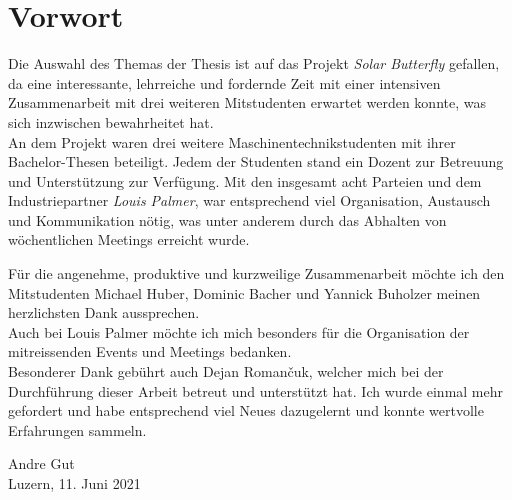 \section*{Vorwort}
Die Auswahl des Themas der Thesis ist auf das Projekt \emph{Solar Butterfly} gefallen, da eine interessante, lehrreiche und fordernde Zeit mit einer intensiven Zusammenarbeit mit drei weiteren Mitstudenten erwartet werden konnte, was sich inzwischen bewahrheitet hat.\\
An dem Projekt waren drei weitere Maschinentechnikstudenten mit ihrer Bachelor-Thesen beteiligt. Jedem der Studenten stand ein Dozent zur Betreuung und Unterstützung zur Verfügung. Mit den insgesamt acht Parteien und dem Industriepartner \emph{Louis Palmer}, war entsprechend viel Organisation, Austausch und Kommunikation nötig, was unter anderem durch das Abhalten von wöchentlichen Meetings erreicht wurde.

Für die angenehme, produktive und kurzweilige Zusammenarbeit möchte ich den Mitstudenten Michael Huber, Dominic Bacher und Yannick Buholzer meinen herzlichsten Dank aussprechen.\\
Auch bei Louis Palmer möchte ich mich besonders für die Organisation der mitreissenden Events und Meetings bedanken.\\
Besonderer Dank gebührt auch Dejan Roman\v{c}uk, welcher mich bei der Durchführung dieser Arbeit betreut und unterstützt hat. Ich wurde einmal mehr gefordert und habe entsprechend viel Neues dazugelernt und konnte wertvolle Erfahrungen sammeln.

\vspace{2cm}

\begin{flushright}
  Andre Gut\\
  Luzern, 11. Juni 2021
\end{flushright}


%
%
%
\newpage
